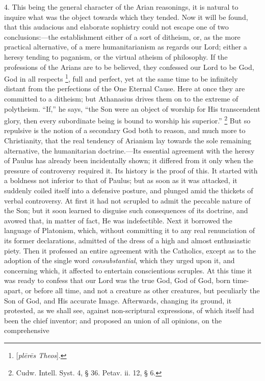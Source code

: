 4. This being the general character of the Arian reasonings, it is
natural to inquire what was the object towards which they tended. Now
it will be found, that this audacious and elaborate sophistry could
not escape one of two conclusions:—the establishment either of a
sort of ditheism, or, as the more practical alternative, of a mere
humanitarianism as regards our Lord; either a heresy tending to
paganism, or the virtual atheism of philosophy. If the professions of
the Arians are to be believed, they confessed our Lord to be God, God
in all respects \footnote{[\emph{pl\={e}r\={e}s Theos}].}, full
and perfect, yet at the same time to be infinitely distant from the
perfections of the One Eternal Cause. Here at once they are committed
to a ditheism; but Athanasius drives them on to the extreme of
polytheism. ``If,'' he says, ``the Son were an object of
worship for His transcendent glory, then every subordinate being is
bound to worship his superior.'' \footnote{Cudw. Intell. Syst. 4, § 36. Petav. ii.
12, § 6.} But so repulsive is the notion of a secondary God both to
reason, and much more to Christianity, that the real tendency of
Arianism lay towards the sole remaining alternative, the humanitarian
doctrine.—Its essential agreement with the heresy of Paulus has
already been incidentally shown; it differed from it only when the
pressure of controversy required it. Its history is the proof of this. It started with a boldness not inferior to that of Paulus; but
as soon as it was attacked, it suddenly coiled itself into a defensive
posture, and plunged amid the thickets of verbal controversy. At first
it had not scrupled to admit the peccable nature of the Son; but it
soon learned to disguise such consequences of its doctrine, and avowed
that, in matter of fact, He was indefectible. Next it borrowed the
language of Platonism, which, without committing it to any real
renunciation of its former declarations, admitted of the dress of a
high and almost enthusiastic piety. Then it professed an entire
agreement with the Catholics, except as to the adoption of the single
word \emph{consubstantial}, which they urged upon it, and concerning
which, it affected to entertain conscientious scruples. At this time
it was ready to confess that our Lord was the true God, God of God,
born time-apart, or before all time, and not a creature as other
creatures, but peculiarly the Son of God, and His accurate Image.
Afterwards, changing its ground, it protested, as we shall see,
against non-scriptural expressions, of which itself had been the chief
inventor; and proposed an union of all opinions, on the comprehensive

